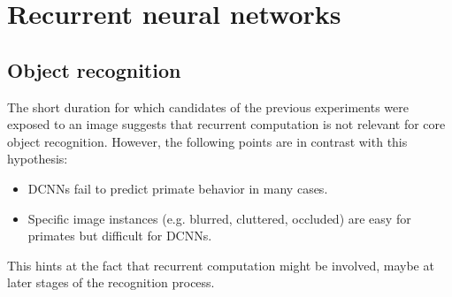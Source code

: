 \section{Recurrent neural networks}


\subsection{Object recognition}

The short duration for which candidates of the previous experiments were exposed to an image 
suggests that recurrent computation is not relevant for core object recognition.
However, the following points are in contrast with this hypothesis:
\begin{itemize}
    \item DCNNs fail to predict primate behavior in many cases.
    \item Specific image instances (e.g. blurred, cluttered, occluded) are easy for primates but difficult for DCNNs.
\end{itemize}
This hints at the fact that recurrent computation might be involved, maybe at later stages of the recognition process.

